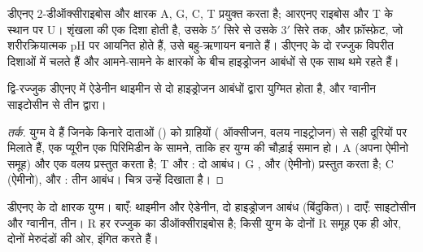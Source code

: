 डीएनए 2-डीऑक्सीराइबोस और क्षारक A, G, C, T प्रयुक्त करता है; आरएनए राइबोस और T के स्थान पर U। शृंखला की एक
दिशा होती है, उसके 5$'$ सिरे से उसके 3$'$ सिरे तक, और फ़ॉस्फ़ेट, जो शरीरक्रियात्मक pH पर आयनित होते हैं, उसे
बहु-ऋणायन बनाते हैं। डीएनए के दो रज्जुक विपरीत दिशाओं में चलते हैं और आमने-सामने के क्षारकों के बीच हाइड्रोजन आबंधों से
एक साथ थमे रहते हैं।

\begin{proposition}[क्षारक युग्मन]\label{prop:b2:biomolecules:pairing}
द्वि-रज्जुक डीएनए में ऐडेनीन थाइमीन से दो हाइड्रोजन आबंधों द्वारा युग्मित होता है, और ग्वानीन साइटोसीन से
तीन द्वारा।
\end{proposition}

\begin{proof}[तर्क]
युग्म वे हैं जिनके किनारे दाताओं () को ग्राहियों ( ऑक्सीजन, वलय
नाइट्रोजन) से सही दूरियों पर मिलाते हैं, एक प्यूरीन एक पिरिमिडीन के सामने, ताकि हर युग्म की
चौड़ाई समान हो। A  (अपना ऐमीनो समूह) और एक वलय  प्रस्तुत करता है; T  और : दो आबंध। G
,  और  (ऐमीनो) प्रस्तुत करता है; C  (ऐमीनो),  और : तीन
आबंध। चित्र उन्हें दिखाता है।
\end{proof}

\begin{omfigure}
%
\hspace{2.3em}%
\hspace{1.5em}
%
\hspace{2.3em}%
\par\vspace{6pt}

{\small डीएनए के दो क्षारक युग्म। बाएँ: थाइमीन और ऐडेनीन, दो हाइड्रोजन आबंध (बिंदुकित)। दाएँ:
साइटोसीन और ग्वानीन, तीन। R हर रज्जुक का डीऑक्सीराइबोस है; किसी युग्म के दोनों R समूह
एक ही ओर, दोनों मेरुदंडों की ओर, इंगित करते हैं।}
\end{omfigure}


